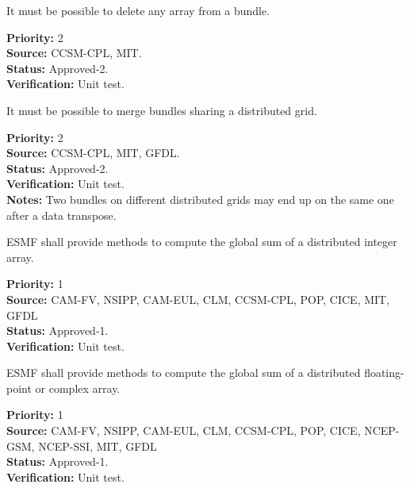 
It must be possible to delete any array from a bundle.

\begin{reqlist}
{\bf Priority:} 2 \\
{\bf Source:} CCSM-CPL, MIT. \\
{\bf Status:} Approved-2. \\
{\bf Verification:} Unit test. 
\end{reqlist}


It must be possible to merge bundles sharing a distributed grid.

\begin{reqlist}
{\bf Priority:} 2 \\
{\bf Source:} CCSM-CPL, MIT, GFDL. \\
{\bf Status:} Approved-2. \\
{\bf Verification:} Unit test. \\
{\bf Notes:} Two bundles on different distributed grids may end up on the same
  one after a data transpose.  
\end{reqlist}



ESMF shall provide methods to compute the global sum of a distributed
integer array.

\begin{reqlist}
{\bf Priority:} 1 \\ 
{\bf Source:} CAM-FV, NSIPP, CAM-EUL, CLM, CCSM-CPL, POP, CICE, MIT, GFDL \\
{\bf Status:} Approved-1. \\
{\bf Verification:} Unit test. 
\end{reqlist}



ESMF shall provide methods to compute the global sum of a distributed
floating-point or complex array.

\begin{reqlist}
{\bf Priority:} 1 \\ 
{\bf Source:} CAM-FV, NSIPP, CAM-EUL, CLM, CCSM-CPL, POP, CICE, NCEP-GSM, NCEP-SSI, MIT, GFDL \\
{\bf Status:} Approved-1. \\
{\bf Verification:} Unit test. 
\end{reqlist}

